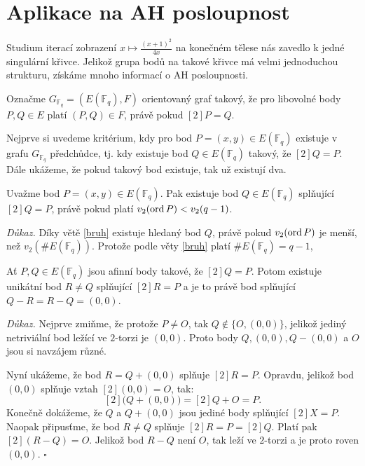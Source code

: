 \documentclass[12pt]{report}
\begin{document}
\section{Aplikace na AH posloupnost}

Studium iterací zobrazení $x \longmapsto \frac{(x+1)^2}{4x}$ na konečném tělese nás zavedlo k jedné singulární křivce. Jelikož grupa bodů na takové křivce má velmi jednoduchou strukturu, získáme mnoho informací o AH posloupnosti. 

\begin{definice}
Označme $G_{\mathbb{F}_q} = (E(\mathbb{F}_q),F)$ orientovaný graf takový, že pro libovolné body $P,Q \in E$ platí $(P,Q) \in F$, právě pokud $[2]P=Q$.
\end{definice}


Nejprve si uvedeme kritérium, kdy pro bod $P = (x,y) \in E(\mathbb{F}_q)$ existuje v grafu $G_{\mathbb{F}_q}$ předchůdce, tj. kdy existuje bod $Q \in E(\mathbb{F}_q)$ takový, že $[2]Q = P$. Dále ukážeme, že pokud takový bod existuje, tak už existují dva.

\begin{veta}\label{jedna}
Uvažme bod $P=(x,y) \in E(\mathbb{F}_q)$. Pak existuje bod $Q \in E(\mathbb{F}_q)$ splňující $[2]Q = P$, právě pokud platí $v_2 (\operatorname{ord} P) < v_2 (q-1)$.
\end{veta}
\noindent \textit{Důkaz.} Díky větě \ref{bruh} existuje hledaný bod $Q$, právě pokud $v_2(\operatorname{ord} P)$ je menší, než $v_2 (\# E(\mathbb{F}_q))$. Protože podle věty \ref{bruh} platí $\# E(\mathbb{F}_q) = q-1$, 


\begin{veta}\label{dva}
Ať $P,Q \in E(\mathbb{F}_q)$ jsou afinní body takové, že $[2]Q = P$. Potom existuje unikátní bod $R \neq Q$ splňující $[2]R = P$ a je to právě bod splňující $Q-R = R-Q = (0,0)$.
\end{veta}

\noindent\textit{Důkaz.} Nejprve zmiňme, že protože $P \neq O$, tak $Q \not\in \lbrace O,(0,0) \rbrace$, jelikož jediný netriviální bod ležící ve $2$-torzi je $(0,0)$. Proto body $Q,(0,0), Q-(0,0)$ a $O$ jsou si navzájem různé.

Nyní ukážeme, že bod $R=Q+(0,0)$ splňuje $[2]R=P$. Opravdu, jelikož bod $(0,0)$ splňuje vztah $[2](0,0) = O$, tak:
$$[2]\big(Q+(0,0)\big) = [2]Q  + O= P.$$
Konečně dokážeme, že $Q$ a $Q+(0,0)$ jsou jediné body splňující $[2]X = P$.  Naopak připusťme, že bod $R \neq Q$ splňuje $[2]R = P = [2]Q$. Platí pak $[2](R-Q) = O$. Jelikož bod $R-Q$ není $O$, tak leží ve $2$-torzi a je proto roven $(0,0)$. \hfill $\square$\\
\end{document}
